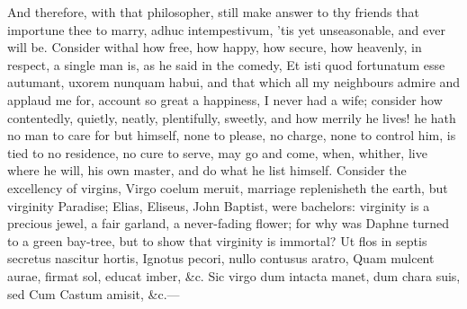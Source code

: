 {And therefore, with that philosopher, still make answer to thy friends
that importune thee to marry, adhuc intempestivum, 'tis yet
unseasonable, and ever will be.
Consider withal how free, how happy, how secure, how heavenly, in
respect, a single man is, as he said in the comedy, Et isti quod
fortunatum esse autumant, uxorem nunquam habui, and that which all my
neighbours admire and applaud me for, account so great a happiness, I
never had a wife; consider how contentedly, quietly, neatly,
plentifully, sweetly, and how merrily he lives! he hath no man to care
for but himself, none to please, no charge, none to control him, is
tied to no residence, no cure to serve, may go and come, when, whither,
live where he will, his own master, and do what he list himself.
Consider the excellency of virgins,  Virgo coelum meruit,
marriage replenisheth the earth, but virginity Paradise; Elias,
Eliseus, John Baptist, were bachelors: virginity is a precious jewel, a
fair garland, a never-fading flower; for why was Daphne turned to
a green bay-tree, but to show that virginity is immortal?
Ut flos in septis secretus nascitur hortis,
Ignotus pecori, nullo contusus aratro,
Quam mulcent aurae, firmat sol, educat imber, \&c.
Sic virgo dum intacta manet, dum chara suis, sed
Cum Castum amisit, \&c.---

}
